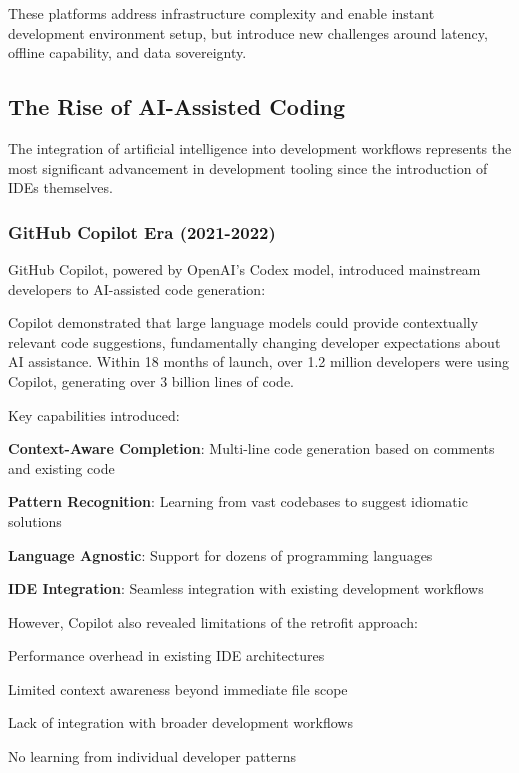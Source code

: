These platforms address infrastructure complexity and enable instant development environment setup, but introduce new challenges around latency, offline capability, and data sovereignty.

\subsection{The Rise of AI-Assisted Coding}
\label{subsec:rise-ai-coding}

The integration of artificial intelligence into development workflows represents the most significant advancement in development tooling since the introduction of IDEs themselves.

\subsubsection{GitHub Copilot Era (2021-2022)}

GitHub Copilot, powered by OpenAI's Codex model, introduced mainstream developers to AI-assisted code generation:

\begin{successbox}
Copilot demonstrated that large language models could provide contextually relevant code suggestions, fundamentally changing developer expectations about AI assistance. Within 18 months of launch, over 1.2 million developers were using Copilot, generating over 3 billion lines of code.
\end{successbox}

Key capabilities introduced:
\begin{compactlist}
    \item \textbf{Context-Aware Completion}: Multi-line code generation based on comments and existing code
    \item \textbf{Pattern Recognition}: Learning from vast codebases to suggest idiomatic solutions
    \item \textbf{Language Agnostic}: Support for dozens of programming languages
    \item \textbf{IDE Integration}: Seamless integration with existing development workflows
\end{compactlist}

However, Copilot also revealed limitations of the retrofit approach:
\begin{compactlist}
    \item Performance overhead in existing IDE architectures
    \item Limited context awareness beyond immediate file scope
    \item Lack of integration with broader development workflows
    \item No learning from individual developer patterns
\end{compactlist}

